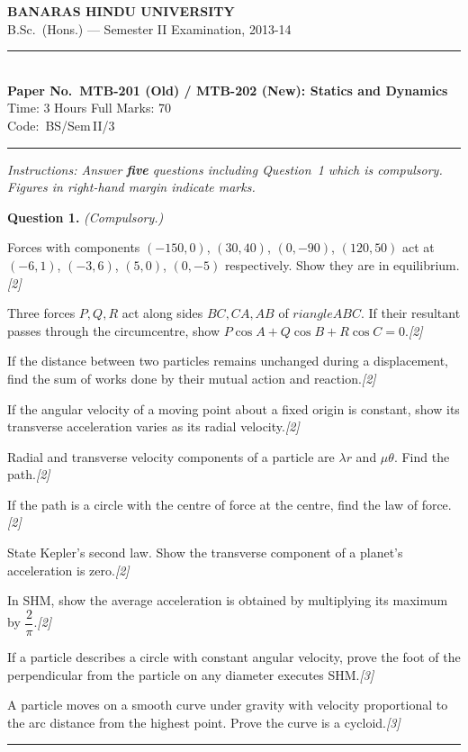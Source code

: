 \documentclass[11pt,a4paper]{article}
\newcommand{\pts}[1]{\hfill   \textit{[#1]}}
\begin{document}
\begin{center}
  {\large\bfseries BANARAS HINDU UNIVERSITY}\\[2pt]
  {\normalsize B.Sc.\ (Hons.) --- Semester II Examination, 2013-14}\\[6pt]
  \rule{0.8\linewidth}{0.5pt}\\[6pt]
  {\large\bfseries Paper No.\ MTB-201 (Old) / MTB-202 (New): Statics and Dynamics}\\[4pt]
  {\normalsize Time: 3 Hours \hfill Full Marks: 70}\\[2pt]
  {\small Code:\ BS/Sem\,II/3}
\end{center}
\rule{\linewidth}{0.4pt}
\smallskip



\noindent   \textit{Instructions: Answer   \textbf{five} questions including Question~1 which is compulsory. Figures in right-hand margin indicate marks.}
\bigskip




\noindent   \textbf{Question 1.}   \textit{(Compulsory.)}

\begin{parts}
  \item Forces with components $(-150,0)$, $(30,40)$, $(0,-90)$, $(120,50)$ act at $(-6,1)$, $(-3,6)$, $(5,0)$, $(0,-5)$ respectively. Show they are in equilibrium.\pts{2}
  \item Three forces $P,Q,R$ act along sides $BC,CA,AB$ of $ riangle ABC$. If their resultant passes through the circumcentre, show $P\cos A+Q\cos B+R\cos C=0$.\pts{2}
  \item If the distance between two particles remains unchanged during a displacement, find the sum of works done by their mutual action and reaction.\pts{2}
  \item If the angular velocity of a moving point about a fixed origin is constant, show its transverse acceleration varies as its radial velocity.\pts{2}
  \item Radial and transverse velocity components of a particle are $\lambda r$ and $\mu \theta$. Find the path.\pts{2}
  \item If the path is a circle with the centre of force at the centre, find the law of force.\pts{2}
  \item State Kepler's second law. Show the transverse component of a planet's acceleration is zero.\pts{2}
  \item In SHM, show the average acceleration is obtained by multiplying its maximum by $\dfrac{2}{\pi}$.\pts{2}
  \item If a particle describes a circle with constant angular velocity, prove the foot of the perpendicular from the particle on any diameter executes SHM.\pts{3}
  \item A particle moves on a smooth curve under gravity with velocity proportional to the arc distance from the highest point. Prove the curve is a cycloid.\pts{3}
\end{parts}
\medskip\rule{\linewidth}{0.2pt}
\end{document}
